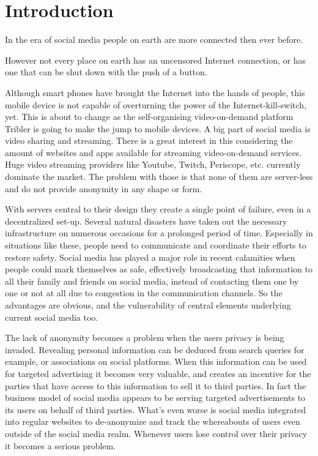 

\chapter{Introduction}

In the era of social media people on earth are more connected then ever before.

However not every place on earth has an uncensored Internet connection, or has one that can be shut down with the push of a button.

Although smart phones have brought the Internet into the hands of people, this mobile device is not capable of overturning the power of the Internet-kill-switch, yet.
This is about to change as the self-organising video-on-demand platform Tribler is going to make the jump to mobile devices.
A big part of social media is video sharing and streaming.
There is a great interest in this considering the amount of websites and apps available for streaming video-on-demand services.
Huge video streaming providers like Youtube, Twitch, Periscope, etc. currently dominate the market.
The problem with those is that none of them are server-less and do not  provide anonymity in any shape or form.

With servers central to their design they create a single point of failure, even in a decentralized set-up.
Several natural disasters have taken out the necessary infrastructure on numerous occasions for a prolonged period of time.
Especially in situations like these, people need to communicate and coordinate their efforts to restore safety.
Social media has played a major role in recent calamities when people could mark themselves as safe, effectively broadcasting that information to all their family and friends on social media, instead of contacting them one by one or not at all due to congestion in the communication channels.
So the advantages are obvious, and the vulnerability of central elements underlying current social media too.

The lack of anonymity becomes a problem when the users privacy is being invaded.
Revealing personal information can be deduced from search queries for example, or associations on social platforms.
When this information can be used for targeted advertising it becomes very valuable, and creates an incentive for the parties that have access to this information to sell it to third parties.
In fact the business model of social media appears to be serving targeted advertisements to its users on behalf of third parties.
What's even worse is social media integrated into regular websites to de-anonymize and track the whereabouts of users even outside of the social media realm.
Whenever users lose control over their privacy it becomes a serious problem.

